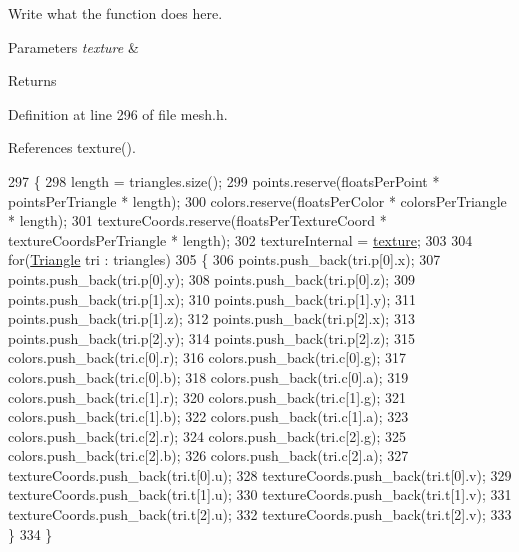 Write what the function does here. 


\begin{DoxyParams}{Parameters}
{\em texture} & \\
\hline
\end{DoxyParams}
\begin{DoxyReturn}{Returns}

\end{DoxyReturn}


Definition at line 296 of file mesh.\+h.



References texture().


\begin{DoxyCode}
297         \{
298             length = triangles.size();
299             points.reserve(floatsPerPoint * pointsPerTriangle * length);
300             colors.reserve(floatsPerColor * colorsPerTriangle * length);
301             textureCoords.reserve(floatsPerTextureCoord * textureCoordsPerTriangle * length);
302             textureInternal = \hyperlink{classMesh__t_ab6e561d676c5e24beae4d91525f085f9}{texture};
303 
304             \textcolor{keywordflow}{for}(\hyperlink{structTriangle}{Triangle} tri : triangles)
305             \{
306                 points.push\_back(tri.p[0].x);
307                 points.push\_back(tri.p[0].y);
308                 points.push\_back(tri.p[0].z);
309                 points.push\_back(tri.p[1].x);
310                 points.push\_back(tri.p[1].y);
311                 points.push\_back(tri.p[1].z);
312                 points.push\_back(tri.p[2].x);
313                 points.push\_back(tri.p[2].y);
314                 points.push\_back(tri.p[2].z);
315                 colors.push\_back(tri.c[0].r);
316                 colors.push\_back(tri.c[0].g);
317                 colors.push\_back(tri.c[0].b);
318                 colors.push\_back(tri.c[0].a);
319                 colors.push\_back(tri.c[1].r);
320                 colors.push\_back(tri.c[1].g);
321                 colors.push\_back(tri.c[1].b);
322                 colors.push\_back(tri.c[1].a);
323                 colors.push\_back(tri.c[2].r);
324                 colors.push\_back(tri.c[2].g);
325                 colors.push\_back(tri.c[2].b);
326                 colors.push\_back(tri.c[2].a);
327                 textureCoords.push\_back(tri.t[0].u);
328                 textureCoords.push\_back(tri.t[0].v);
329                 textureCoords.push\_back(tri.t[1].u);
330                 textureCoords.push\_back(tri.t[1].v);
331                 textureCoords.push\_back(tri.t[2].u);
332                 textureCoords.push\_back(tri.t[2].v);
333             \}
334         \}
\end{DoxyCode}
